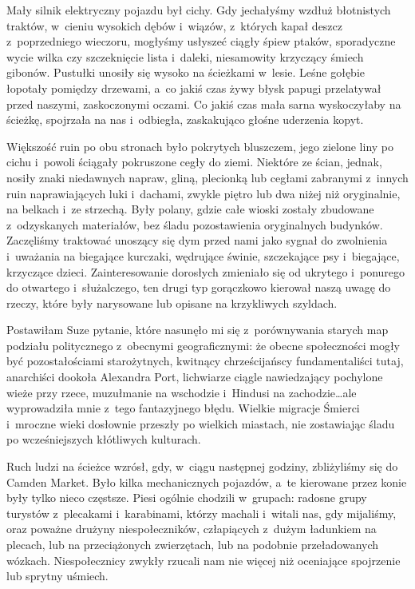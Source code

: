 \documentclass[oneside,polish,11pt,sfheadings]{mwbk}
\begin{document}
Mały silnik elektryczny pojazdu był cichy. Gdy jechałyśmy wzdłuż
błotnistych traktów, w~cieniu wysokich dębów i~wiązów, z~których kapał
deszcz z~poprzedniego wieczoru, mogłyśmy usłyszeć ciągły śpiew ptaków,
sporadyczne wycie wilka czy szczeknięcie lista i~daleki, niesamowity
krzyczący śmiech gibonów. Pustułki unosiły się wysoko na ścieżkami w~lesie. Leśne gołębie łopotały pomiędzy drzewami, a~co jakiś czas żywy
błysk papugi przelatywał przed naszymi, zaskoczonymi oczami. Co jakiś
czas mała sarna wyskoczyłaby na ścieżkę, spojrzała na nas i~odbiegła,
zaskakująco głośne uderzenia kopyt.

Większość ruin po obu stronach było pokrytych bluszczem, jego zielone
liny po cichu i~powoli ściągały pokruszone cegły do ziemi. Niektóre ze
ścian, jednak, nosiły znaki niedawnych napraw, gliną, plecionką lub
cegłami zabranymi z~innych ruin naprawiających luki i~dachami, zwykle
piętro lub dwa niżej niż oryginalnie, na belkach i~ze strzechą. Były
polany, gdzie całe wioski zostały zbudowane z~odzyskanych materiałów,
bez śladu pozostawienia oryginalnych budynków. Zaczęliśmy traktować
unoszący się dym przed nami jako sygnał do zwolnienia i~uważania na
biegające kurczaki, wędrujące świnie, szczekające psy i~biegające,
krzyczące dzieci. Zainteresowanie dorosłych zmieniało się od ukrytego i~ponurego do otwartego i~służalczego, ten drugi typ gorączkowo kierował
naszą uwagę do rzeczy, które były narysowane lub opisane na krzykliwych
szyldach.

Postawiłam Suze pytanie, które nasunęło mi się z~porównywania starych
map podziału politycznego z~obecnymi geograficznymi: że obecne
społeczności mogły być pozostałościami starożytnych, kwitnący
chrześcijańscy fundamentaliści tutaj, anarchiści dookoła Alexandra Port,
lichwiarze ciągle nawiedzający pochylone wieże przy rzece, muzułmanie na
wschodzie i~Hindusi na zachodzie\ldots  ale wyprowadziła mnie z~tego
fantazyjnego błędu. Wielkie migracje Śmierci i~mroczne wieki dosłownie
przeszły po wielkich miastach, nie zostawiając śladu po wcześniejszych
kłótliwych kulturach.

Ruch ludzi na ścieżce wzrósł, gdy, w~ciągu następnej godziny,
zbliżyliśmy się do Camden Market. Było kilka mechanicznych pojazdów, a~te kierowane przez konie były tylko nieco częstsze. Piesi ogólnie
chodzili w~grupach: radosne grupy turystów z~plecakami i~karabinami,
którzy machali i~witali nas, gdy mijaliśmy, oraz poważne drużyny
niespołeczników, człapiących z~dużym ładunkiem na plecach, lub na
przeciążonych zwierzętach, lub na podobnie przeładowanych wózkach.
Niespołecznicy zwykły rzucali nam nie więcej niż oceniające spojrzenie
lub sprytny uśmiech.
\end{document}
